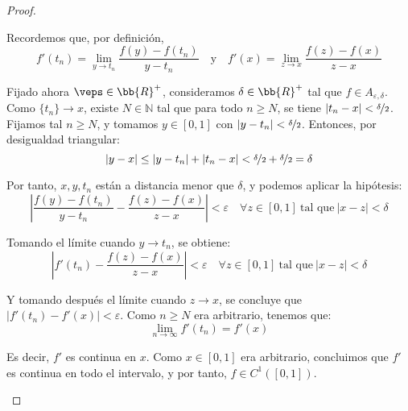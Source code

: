 \documentclass[12pt]{article}
\begin{document}
\begin{ejercicio}
\begin{proof}
\begin{description}
                Recordemos que, por definición,
                \[
                f'(t_n) = \lim_{y \to t_n} \frac{f(y) - f(t_n)}{y - t_n}
                \quad \text{y} \quad
                f'(x) = \lim_{z \to x} \frac{f(z) - f(x)}{z - x}
                \]

                Fijado ahora $\veps\in \bb{R}^+$, consideramos $\delta \in \bb{R}^+$ tal que \( f \in A_{\varepsilon,\delta} \).  Como \( \{t_n\} \to x \), existe \( N \in \mathbb{N} \) tal que para todo \( n \geq N \), se tiene \( |t_n - x| < \nicefrac{\delta}{2} \). Fijamos tal \( n \geq N \), y tomamos \( y \in [0,1] \) con \( |y - t_n| < \nicefrac{\delta}{2} \). Entonces, por desigualdad triangular:
                \[
                |y - x| \leq |y - t_n| + |t_n - x| < \nicefrac{\delta}{2} + \nicefrac{\delta}{2} = \delta
                \]

                Por tanto, \( x, y, t_n \) están a distancia menor que \( \delta \), y podemos aplicar la hipótesis:
                \[
                \left| \frac{f(y) - f(t_n)}{y - t_n} - \frac{f(z) - f(x)}{z - x} \right| < \varepsilon
                \quad \forall z\in [0,1]\ \text{tal que}\ |x-z|<\delta
                \]

                Tomando el límite cuando \( y \to t_n \), se obtiene:
                \[
                \left| f'(t_n) - \frac{f(z) - f(x)}{z - x} \right| < \varepsilon
                \quad \forall z\in [0,1]\ \text{tal que}\ |x-z|<\delta
                \]

                Y tomando después el límite cuando \( z \to x \), se concluye que $|f'(t_n) - f'(x)| < \varepsilon$. Como $n\geq N$ era arbitrario, tenemos que:
                \[
                \lim_{n \to \infty} f'(t_n) = f'(x)
                \]

                Es decir, \( f' \) es continua en \( x \). Como \( x \in [0,1] \) era arbitrario, concluimos que \( f' \) es continua en todo el intervalo, y por tanto, \( f \in C^1([0,1]) \).
            \end{description}
        \end{proof}
    \end{ejercicio}
\end{document}
